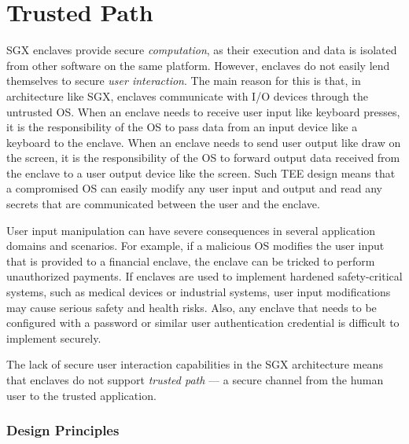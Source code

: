 
\section*{Trusted Path}

SGX enclaves provide secure \emph{computation}, as their execution and data is isolated from other software on the same platform. However, enclaves do not easily lend themselves to secure \emph{user interaction}. The main reason for this is that, in architecture like SGX, enclaves communicate with I/O devices through the untrusted OS. When an enclave needs to receive user input like keyboard presses, it is the responsibility of the OS to pass data from an input device like a keyboard to the enclave. When an enclave needs to send user output like draw on the screen, it is the responsibility of the OS to forward output data received from the enclave to a user output device like the screen. Such TEE design means that a compromised OS can easily modify any user input and output and read any secrets that are communicated between the user and the enclave. 

User input manipulation can have severe consequences in several application domains and scenarios. For example, if a malicious OS modifies the user input that is provided to a financial enclave, the enclave can be tricked to perform unauthorized payments. If enclaves are used to implement hardened safety-critical systems, such as medical devices or industrial systems, user input modifications may cause serious safety and health risks. Also, any enclave that needs to be configured with a password or similar user authentication credential is difficult to implement securely.

The lack of secure user interaction capabilities in the SGX architecture means that enclaves do not support \emph{trusted path} --- a secure channel from the human user to the trusted application. 



\subsubsection*{Design Principles}

